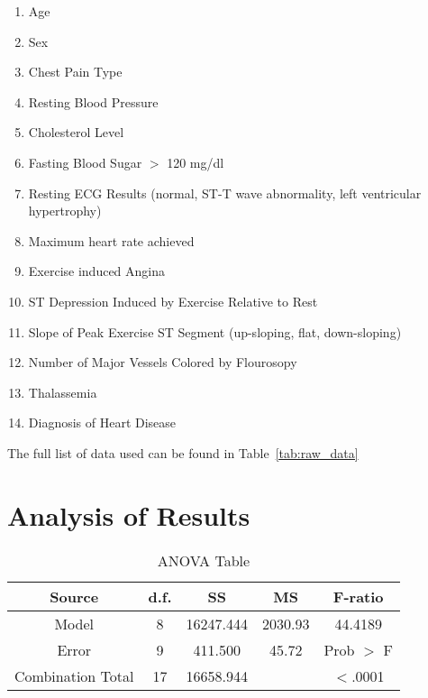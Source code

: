 \documentclass[times]{article}
\begin{document}
   \begin{enumerate}
      \itemsep0em
      \item Age
      \item Sex
      \item Chest Pain Type
      \item Resting Blood Pressure
      \item Cholesterol Level
      \item Fasting Blood Sugar $>$ 120 mg/dl
      \item Resting ECG Results (normal, ST-T wave abnormality, left ventricular hypertrophy)
      \item Maximum heart rate achieved
      \item Exercise induced Angina
      \item ST Depression Induced by Exercise Relative to Rest
      \item Slope of Peak Exercise ST Segment (up-sloping, flat, down-sloping)
      \item Number of Major Vessels Colored by Flourosopy
      \item Thalassemia
      \item Diagnosis of Heart Disease
   \end{enumerate}

   The full list of data used can be found in Table~\ref{tab:raw_data}

   \section{Analysis of Results}

   \begin{table}[H]
      \centering
      \caption{ANOVA Table}
      \label{tab:anova}
      \begin{tabular}{| c | c | c | c | c |}
         \hline
         Source              & d.f.   & SS        & MS      & F-ratio    \\
         \hline
         Model               & 8      & 16247.444 & 2030.93 & 44.4189    \\
         \hline
         Error               & 9      & 411.500   & 45.72   & Prob $>$ F \\
         \hline
         Combination Total   & 17     & 16658.944 &         & $<$.0001   \\
         \hline
      \end{tabular}
   \end{table}
\end{document}
